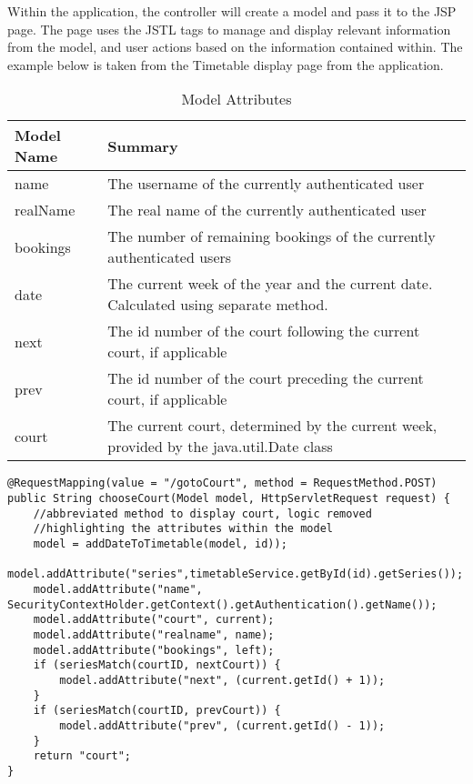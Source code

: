 Within the application, the controller will create a model and pass it to the JSP page. The page uses the JSTL tags to manage and display relevant information from the model, and user actions based on the information contained within. The example below is taken from the Timetable display page from the application.\newline

\begin{table}[H]
\begin{center}
    \begin{tabular}{ | l | l | p{5cm} |}
    \hline
    Model Name & Summary \\ \hline
    name & The username of the currently authenticated user  \\ \hline
    realName & The real name of the currently authenticated user\\ \hline
	bookings & The number of remaining bookings of the currently authenticated users\\ \hline
	date & The current week of the year and the current date. Calculated using separate method.\\ \hline
	next & The id number of the court following the current court, if applicable\\ \hline
    prev & The id number of the court preceding the current court, if applicable\\ \hline
	court & The current court, determined by the current week, provided by the java.util.Date class \\
    \hline
    \end{tabular}
\end{center}
\caption{Model Attributes}
\end{table}
\pagebreak
\begin{lstlisting}
@RequestMapping(value = "/gotoCourt", method = RequestMethod.POST)
public String chooseCourt(Model model, HttpServletRequest request) {
	//abbreviated method to display court, logic removed
	//highlighting the attributes within the model
	model = addDateToTimetable(model, id));
	model.addAttribute("series",timetableService.getById(id).getSeries());
	model.addAttribute("name", SecurityContextHolder.getContext().getAuthentication().getName());
	model.addAttribute("court", current);
	model.addAttribute("realname", name);
	model.addAttribute("bookings", left);
	if (seriesMatch(courtID, nextCourt)) {
		model.addAttribute("next", (current.getId() + 1));
	}
	if (seriesMatch(courtID, prevCourt)) {
		model.addAttribute("prev", (current.getId() - 1));
	}
	return "court";
}
\end{lstlisting}	

